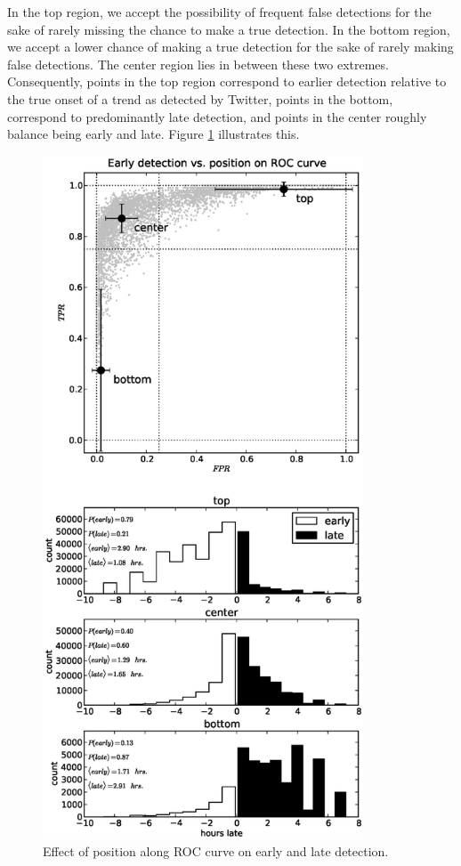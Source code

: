 In the top region, we accept the possibility of frequent false detections for
the sake of rarely missing the chance to make a true detection. In the bottom
region, we accept a lower chance of making a true detection for the sake of
rarely making false detections. The center region lies in between these two
extremes. Consequently, points in the top region correspond to earlier detection
relative to the true onset of a trend as detected by Twitter, points in the
bottom, correspond to predominantly late detection, and points in the center
roughly balance being early and late. Figure \ref{fig:early_vs_roc} illustrates this.
\begin{figure}[!h]
\begin{center}
\includegraphics[height=8in]{../fig/final/early_vs_roc}
\end{center}
\caption{\label{fig:early_vs_roc} Effect of position along ROC curve on early
  and late detection.}
\end{figure}

